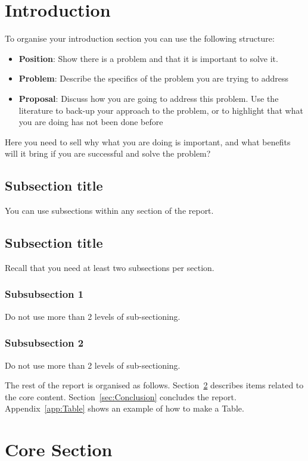 \documentclass{UoNMCHA}
\numberwithin{equation}{section}
\begin{document}
\section{Introduction}
To organise your introduction section you can use the following structure:
\begin{itemize}
    \item \textbf{Position}: Show there is a problem and that it is important to solve it.
    \item \textbf{Problem}: Describe the specifics of the problem you are trying to address
    \item \textbf{Proposal}: Discuss how you are going to address this problem. Use the literature to back-up your approach to the problem, or to highlight that what you are doing has not been done before
\end{itemize}
Here you need to sell why what you are doing is important, and what benefits will it bring if you are successful and solve the problem? 
%
\subsection{Subsection title}
You can use subsections within any section of the report. 
\subsection{Subsection title}
Recall that you need at least two subsections per section.
\subsubsection{Subsubsection 1}
Do not use more than 2 levels of sub-sectioning.
\subsubsection{Subsubsection 2}
Do not use more than 2 levels of sub-sectioning.

The rest of the report is organised as follows. Section~\ref{sec:Core Section} describes items related to the core content. Section~\ref{sec:Conclusion} concludes the report. Appendix~\ref{app:Table} shows an example of how to make a Table.
\section{Core Section}\label{sec:Core Section}
\end{document}
